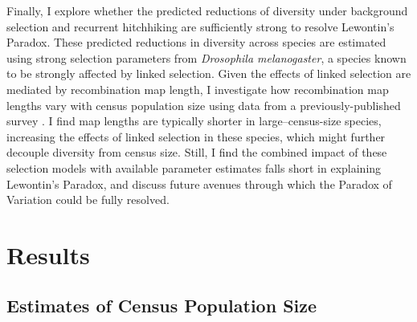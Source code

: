 \documentclass[9pt,lineno]{elife}
\begin{document}
Finally, I explore whether the predicted reductions of diversity under
background selection and recurrent hitchhiking are sufficiently strong to
resolve Lewontin's Paradox. These predicted reductions in diversity across
species are estimated using strong selection parameters from \emph{Drosophila
melanogaster}, a species known to be strongly affected by linked selection.
Given the effects of linked selection are mediated by recombination map length,
I investigate how recombination map lengths vary with census population size
using data from a previously-published survey \citep{Stapley2017-fs}. I
find map lengths are typically shorter in large--census-size species,
increasing the effects of linked selection in these species, which might
further decouple diversity from census size. Still, I find the combined impact
of these selection models with available parameter estimates falls short in
explaining Lewontin's Paradox, and discuss future avenues through which the
Paradox of Variation could be fully resolved.


\section{Results}

\subsection{Estimates of Census Population Size}
\end{document}
